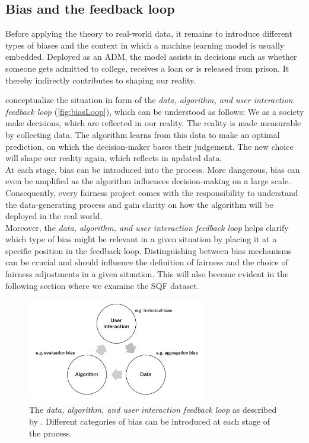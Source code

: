 \subsection{Bias and the feedback loop}
Before applying the theory to real-world data, it remains to introduce different types of biases and the context in which a machine learning model is usually embedded.
Deployed as an ADM, the model assists in decisions such as whether someone gets admitted to college, receives a loan or is released from prison. It thereby indirectly contributes to shaping our reality.\par
\cite{mehrabi2022} conceptualize the situation in form of the \textit{data, algorithm, and user interaction feedback loop} (\autoref{fig:biasLoop}), which can be understood as follows:
We as a society make decisions, which are reflected in our reality. The reality is made measurable by collecting data. The algorithm learns from this data to make an optimal prediction, on which the decision-maker bases their judgement. The new choice will shape our reality again, which reflects in updated data.\\ 
At each stage, bias can be introduced into the process. More dangerous, bias can even be amplified as the algorithm influences decision-making on a large scale.
Consequently, every fairness project comes with the responsibility to understand the data-generating process and gain clarity on how the algorithm will be deployed in the real world.\\
Moreover, the \textit{data, algorithm, and user interaction feedback loop} helps clarify which type of bias might be relevant in a given situation by placing it at a specific position in the feedback loop. Distinguishing between bias mechanisms can be crucial and should influence the definition of fairness and the choice of fairness adjustments in a given situation. This will also become evident in the following section where we examine the SQF dataset.

\begin{figure}
    \centering
    \includegraphics[width=0.7\textwidth]{../figures/bias_loop.png}
    \caption{The \textit{data, algorithm, and user interaction feedback loop} as described by \cite{mehrabi2022}. Different categories of bias can be introduced at each stage of the process.}
    \label{fig:biasLoop}
\end{figure}

